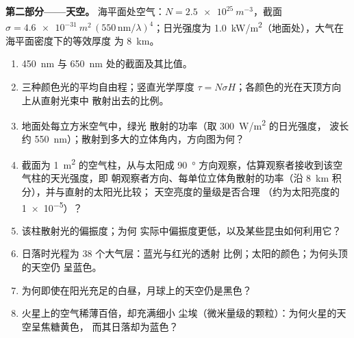 \begin{problem}
\medskip
\noindent\textbf{第二部分——天空。}
海平面处空气：$N = \qty{2.5e25}{m^{-3}}$，截面 $\sigma =
\qty{4.6e-31}{m^2}\,(550\,\text{nm}/\lambda)^4$；日光强度为
\qty{1.0}{kW/m^2}（地面处），大气在海平面密度下的等效厚度
为 \qty{8}{km}。
\begin{enumerate}[resume]
  \item \qty{450}{nm} 与 \qty{650}{nm} 处的截面及其比值。
  \item 三种颜色光的平均自由程；竖直光学厚度
        $\tau = N\sigma H$；各颜色的光在天顶方向上从直射光束中
        散射出去的比例。
  \item 地面处每立方米空气中，绿光
        散射的功率（取 \qty{300}{W/m^2} 的日光强度，
        波长约 \qty{550}{nm}）；散射到多大的立体角内，方向图为何？
  \item 截面为 \qty{1}{m^2} 的空气柱，从与太阳成 \qty{90}{\degree}
        方向观察，估算观察者接收到该空气柱的天光强度，即
        朝观察者方向、每单位立体角散射的功率（沿
        \qty{8}{km} 积分），并与直射的太阳光比较；
        天空亮度的量级是否合理
        （约为太阳亮度的 \qty{1e-5}{}）？
  \item 该柱散射光的偏振度；为何
        实际中偏振度更低，以及某些昆虫如何利用它？
  \item 日落时光程为 $38$ 个大气层：蓝光与红光的透射
        比例；太阳的颜色；为何头顶的天空仍
        呈蓝色。
  \item 为何即使在阳光充足的白昼，月球上的天空仍是黑色？
  \item 火星上的空气稀薄百倍，却充满细小
        尘埃（微米量级的颗粒）：为何火星的天空呈焦糖黄色，
        而其日落却为蓝色？
\end{enumerate}


\end{problem}
